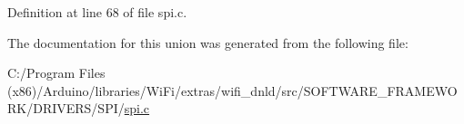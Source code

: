 Definition at line 68 of file spi.\+c.



The documentation for this union was generated from the following file\+:\begin{DoxyCompactItemize}
\item 
C\+:/\+Program Files (x86)/\+Arduino/libraries/\+Wi\+Fi/extras/wifi\+\_\+dnld/src/\+S\+O\+F\+T\+W\+A\+R\+E\+\_\+\+F\+R\+A\+M\+E\+W\+O\+R\+K/\+D\+R\+I\+V\+E\+R\+S/\+S\+P\+I/\hyperlink{spi_8c}{spi.\+c}\end{DoxyCompactItemize}
